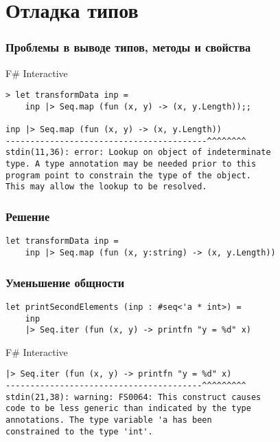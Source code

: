 \documentclass{../../slides-style}
\begin{document}
    \section{Отладка типов}

    \begin{frame}[fragile]
        \frametitle{Проблемы в выводе типов, методы и свойства}
        \begin{alertblock}{F\# Interactive}
            \begin{verbatim}
> let transformData inp =
    inp |> Seq.map (fun (x, y) -> (x, y.Length));;

inp |> Seq.map (fun (x, y) -> (x, y.Length))
-----------------------------------------^^^^^^^^
stdin(11,36): error: Lookup on object of indeterminate 
type. A type annotation may be needed prior to this 
program point to constrain the type of the object. 
This may allow the lookup to be resolved.
            \end{verbatim}
        \end{alertblock}
    \end{frame}

    \begin{frame}[fragile]
        \frametitle{Решение}
        \begin{verbatim}
let transformData inp =
    inp |> Seq.map (fun (x, y:string) -> (x, y.Length))
        \end{verbatim}
    \end{frame}

    \begin{frame}[fragile]
        \frametitle{Уменьшение общности}
        \begin{verbatim}
let printSecondElements (inp : #seq<'a * int>) =
    inp
    |> Seq.iter (fun (x, y) -> printfn "y = %d" x)
        \end{verbatim}

        \begin{alertblock}{F\# Interactive}
            \begin{verbatim}
|> Seq.iter (fun (x, y) -> printfn "y = %d" x)
----------------------------------------^^^^^^^^^
stdin(21,38): warning: FS0064: This construct causes 
code to be less generic than indicated by the type 
annotations. The type variable 'a has been 
constrained to the type 'int'.
            \end{verbatim}
        \end{alertblock}
    \end{frame}
\end{document}
